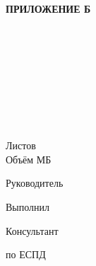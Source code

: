 \begin{ESKDtitlePage}
    \begin{flushright}
        \textbf{ПРИЛОЖЕНИЕ Б} \enspace\enspace
    \end{flushright}
    \begin{center}
        \gpiMinEdu \\
        \gpiEdu \\
        \gpiKaf \\
    \end{center}

    \vfill

    \begin{center}
        \gpiTopic \\
    \end{center}

    \vfill

    \begin{center}
        \textbf{\gpiDocTopic} \\
    \end{center}

    \vfill

    \begin{center}
        \gpiCode \\
        Листов \pageref{LastPage} \\
        Объём \underline{\hspace{2cm}} МБ
    \end{center}

    \vfill

    \begin{flushright}
        \begin{minipage}[t]{.49\textwidth}
            \begin{minipage}[t]{.75\textwidth}
                \begin{flushright}
                    Руководитель

                    Выполнил

                    Консультант

                    по ЕСПД
                \end{flushright}
            \end{minipage}
        \end{minipage}
        \begin{minipage}[t]{.49\textwidth}
            \begin{flushright}
                \begin{minipage}[t]{.75\textwidth}
                    \gpiTeacherName~\gpiTeacherSurname


\end{minipage}
\end{flushright}
\end{minipage}
\end{flushright}
\end{ESKDtitlePage}
